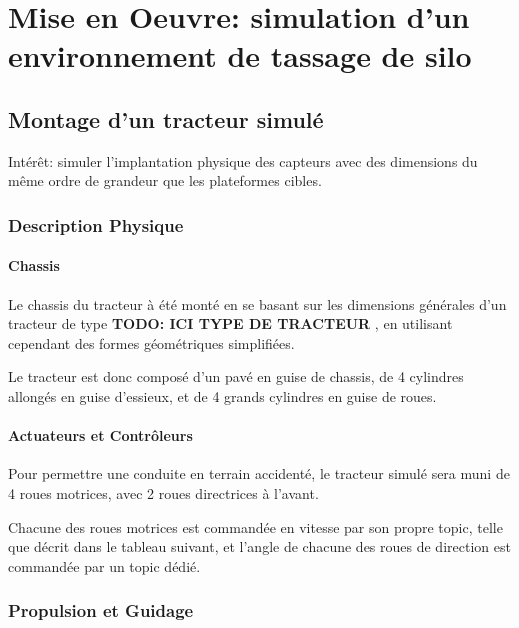 \documentclass[12pt,a4paper]{report}
\begin{document}
		
	\section{Mise en Oeuvre: simulation d'un environnement de tassage de silo}
		\subsection{Montage d'un tracteur simulé}
		Intérêt: simuler l'implantation physique des capteurs avec des dimensions du même ordre de grandeur que les plateformes cibles.
		
		\subsubsection{Description Physique}
			\paragraph{Chassis}
			Le chassis du tracteur à été monté en se basant sur les dimensions générales d'un tracteur de type \textbf{TODO: ICI TYPE DE TRACTEUR} , en utilisant cependant des formes géométriques simplifiées.
			\newline
			
			Le tracteur est donc composé d'un pavé en guise de chassis, de 4 cylindres allongés en guise d'essieux, et de 4 grands cylindres en guise de roues.
			
			\paragraph{Actuateurs et Contrôleurs}
			
			Pour permettre une conduite en terrain accidenté, le tracteur simulé sera muni de 4 roues motrices, avec 2 roues directrices à l'avant.
			
			\para Chacune des roues motrices est commandée en vitesse par son propre topic, telle que décrit dans le tableau suivant, et l'angle de chacune des roues de direction est commandée par un topic dédié.
			
		\subsubsection{Propulsion et Guidage}
		
\end{document}
